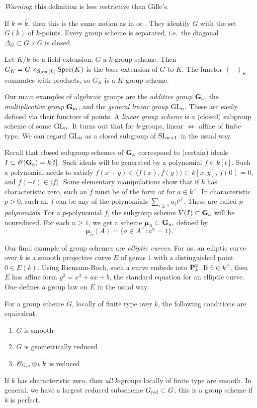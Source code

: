 \emph{Warning}: this definition is less restrictive than Gille's. 

If $k=\bar k$, then this is the same notion as in \cite{b91} or \cite{s09}. 
They identify $G$ with the set $G(k)$ of $k$-points. 
Every group scheme is separated, i.e.\ the diagonal $\Delta_G\subset G\times G$ 
is closed. 

Let $K/k$ be a field extension, $G$ a $k$-group scheme. Then 
$G_K=G\times_{\operatorname{Spec}(k)} \operatorname{Spec}(K)$ is the base-extension of $G$ to 
$K$. The functor $(-)_K$ commutes with products, so $G_K$ is a $K$-group 
scheme. 

Our main examples of algebraic groups are the \emph{additive group} 
$\mathbf{G}_{\mathrm{a}}$, the \emph{multiplicative group} $\mathbf{G}_{\mathrm{m}}$, and the 
\emph{general linear group} $\operatorname{GL}_n$. These are easily defined 
via their functors of points. A \emph{linear group scheme} is a (closed) 
subgroup scheme of some $\operatorname{GL}_n$. It turns out that for 
$k$-groups, linear $\Leftrightarrow$ affine of finite type. We can regard 
$\operatorname{GL}_n$ as a closed subgroup of $\operatorname{SL}_{n+1}$ in the 
usual way. 

Recall that closed subgroup schemes of $\mathbf{G}_{\mathrm{a}}$ correspond to 
(certain) 
ideals $I\subset \mathscr{O}(\mathbf{G}_{\mathrm{a}}) = k[t]$. Such ideals will be 
generated by a polynomial $f\in k[t]$. Such a polynomial needs to 
satisfy $f(x+y) \in \langle f(x),f(y)\rangle \subset k[x,y]$, 
$f(0)=0$, and $f(-t) \in \langle f\rangle$. Some elementary manipulations 
show that if $k$ has characteristic zero, such an $f$ must be of the 
form $a t$ for $a\in k^\times$. In characteristic $p>0$, such an $f$ can 
be any of the polynomials $\sum_{i\geqslant 1} a_i t^{p^i}$. These are 
called \emph{$p$-polynomials}. For a $p$-polynomial $f$, the subgroup 
scheme $V(I)\subset \mathbf{G}_{\mathrm{a}}$ will be nonreduced. For each 
$n\geqslant 1$, we get a scheme $\boldsymbol\mu_n\subset \mathbf{G}_{\mathrm{m}}$ defined 
by 
\[
  \boldsymbol\mu_n(A) = \{a\in A^\times:a^n=1\} .
\]

Our final example of group schemes are \emph{elliptic curves}. For us, 
an elliptic curve over $k$ is a smooth projective curve $E$ of genus $1$ 
with a distinguished point $0\in E(k)$. Using Riemann-Roch, such a curve 
embeds into $\mathbf{P}_k^2$. If $6\in k^\times$, then 
$E$ has affine form $y^2=x^3+a x+b$, the standard equation for an elliptic 
curve. One defines a group law on $E$ in the usual way. 

For a group scheme $G$, locally of finite type over $k$, the following 
conditions are equivalent:
\begin{enumerate}
  \item $G$ is smooth
  \item $G$ is geometrically reduced
  \item $\mathscr{O}_{G,e}\otimes_k \bar k$ is reduced
\end{enumerate}
If $k$ has characteristic zero, then \emph{all} $k$-groups locally of 
finite type are smooth. In general, we have a largest reduced 
subscheme $G_{\mathrm{red}}\subset G$; this is a group scheme if $k$ is 
perfect. 





